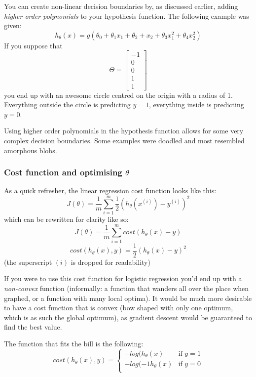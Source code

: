 You can create non-linear decision boundaries by, as discussed earlier, adding \emph{higher order polynomials} to your hypothesis function. The following example was given:
\[
h_\theta(x) = g(\theta_0 + \theta_1x_1 + \theta_2+x_2 + \theta_3x_1^2 + \theta_4x_2^2)
\]
If you suppose that 
\[
\Theta =
\left[
\begin{array}{c}
	-1\\
	0\\
	0\\
	1\\
	1
\end{array}
\right]
\]
you end up with an awesome circle centred on the origin with a radius of 1. Everything outside the circle is predicting $y = 1$, everything inside is predicting $y = 0$.

Using higher order polynomials in the hypothesis function allows for some very complex decision boundaries. Some examples were doodled and most resembled amorphous blobs.

\subsubsection{Cost function and optimising $\theta$}

As a quick refresher, the linear regression cost function looks like this:
\begin{equation}
J(\theta) = \frac{1}{m}\sum^m_{i = 1}\frac{1}{2}
(h_\theta(x^{(i)}) - y^{(i)})^2
\end{equation}
which can be rewritten for clarity like so:
\[
J(\theta) = \frac{1}{m}\sum^m_{i = 1}cost(h_\theta(x) - y)
\]
\[
cost(h_\theta(x), y) = \frac{1}{2}(h_\theta(x) - y)^2
\]
(the superscript $(i)$ is dropped for readability)

If you were to use this cost function for logistic regression you'd end up with a \emph{non-convex} function (informally: a function that wanders all over the place when graphed, or a function with many local optima). It would be much more desirable to have a cost function that is convex (bow shaped with only one optimum, which is as such the global optimum), as gradient descent would be guaranteed to find the best value.

The function that fits the bill is the following:
\begin{equation}
cost(h_\theta(x), y) = \begin{cases}
    -log(h_\theta(x) & \text{if $y = 1$}\\
    -log(-1 h_\theta(x) & \text{if $y = 0$}\\
	\end{cases}
\end{equation}

